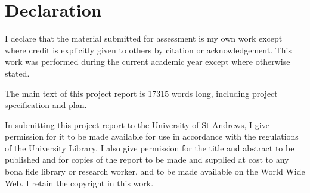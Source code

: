


\chapter*{Declaration}

I declare that the material submitted for assessment is my own work except
where credit is explicitly given to others by citation or acknowledgement. This
work was performed during the current academic year except where otherwise
stated.

The main text of this project report is 17315 words long, including project
specification and plan.

In submitting this project report to the University of St Andrews, I give
permission for it to be made available for use in accordance with the
regulations of the University Library. I also give permission for the title and
abstract to be published and for copies of the report to be made and supplied
at cost to any bona fide library or research worker, and to be made available
on the World Wide Web. I retain the copyright in this work.


